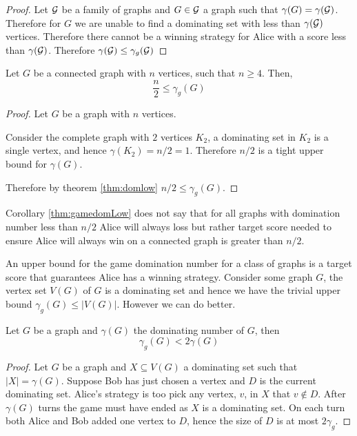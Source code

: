 \begin{proof}
    Let $\mathcal{G}$ be a family of graphs and $G\in\mathcal{G}$ a graph such that $\gamma(G) = \gamma(\mathcal{G})$.
    Therefore for $G$ we are unable to find a dominating set with less than $ \gamma(\mathcal{G}) $ vertices.
    Therefore there cannot be a winning strategy for Alice with a score less than $\gamma(\mathcal{G})$.
    Therefore $\gamma(\mathcal{G}) \leq \gamma_g(\mathcal{G})$
\end{proof}


\begin{corollary} \label{thm:gamedomLow}
    Let $G$ be a connected graph with $n$ vertices, such that $n \geq 4$. Then,    
    \[  \frac{n}{2} \leq \gamma_g(G)  \]    
\end{corollary}

\begin{proof}
    Let $G$ be a graph with $n$ vertices.
    
    Consider the complete graph with $2$ vertices $K_2$, a dominating set in $K_2$ is a single vertex, and hence $\gamma(K_2)=n/2=1$. Therefore $n/2$ is a tight upper bound for $\gamma(G)$. 
    
    Therefore by theorem \ref{thm:domlow} $ n/2 \leq \gamma_g(G)$.
\end{proof}

Corollary \ref{thm:gamedomLow} does not say that for all graphs with domination number less than $n/2$ Alice will always loss but rather target score needed to ensure Alice will always win on a connected graph is greater than $n/2$.


An upper bound for the game domination number for a class of graphs is a target score that guarantees Alice has a winning strategy. Consider some graph $G$, the vertex set $V(G)$ of $G$ is a dominating set and hence we have the trivial upper bound $\gamma_g(G) \leq |V(G)|$. However we can do better.

\begin{theorem}\label{thm:gamedomup}
    Let $G$ be a graph and $\gamma(G)$ the dominating number of $G$, then 
    \[\gamma_g(G)<2\gamma(G)\]
\end{theorem}
\begin{proof}
    Let $G$ be a graph and $X\subseteq V(G)$ a dominating set such that $|X| = \gamma(G)$. Suppose Bob has just chosen a vertex and $D$ is the current dominating set. Alice's strategy is too pick any vertex, $v$, in $X$ that $v\notin D$. After $\gamma(G)$ turns the game must have ended as $X$ is a dominating set. On each turn both Alice and Bob added one vertex to $D$, hence the size of $D$ is at most $2\gamma_g$.
\end{proof}

